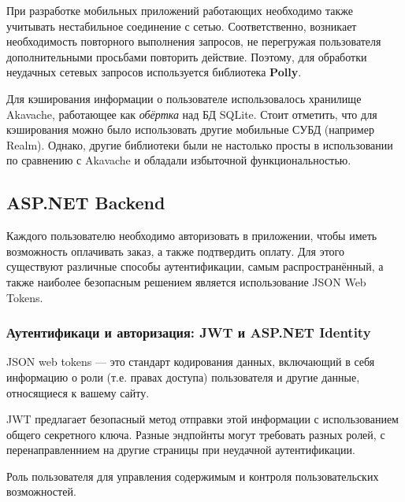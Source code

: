 \documentclass[14pt]{matmex-diploma-custom}
\begin{document}
	    При разработке мобильных приложений работающих необходимо также учитывать нестабильное соединение с сетью.
	    Соответственно, возникает необходимость повторного выполнения запросов, не перегружая пользователя дополнительными просьбами повторить действие.
	    Поэтому, для обработки неудачных сетевых запросов используется библиотека \textbf{Polly}\cite{polly_github}.

	    Для кэширования информации о пользователе использовалось хранилище Akavache\cite{akavache_github}, работающее как {\it обёртка} над БД SQLite.
	    Стоит отметить, что для кэширования можно было использовать другие мобильные СУБД (например Realm).
	    Однако, другие библиотеки были не настолько просты в использовании по сравнению с Akavache и обладали избыточной функциональностью.

	\subsection{ASP.NET Backend}
	    Каждого пользователю необходимо авторизовать в приложении, чтобы иметь возможность оплачивать заказ, а также подтвердить оплату.
	    Для этого существуют различные способы аутентификации, самым распространённый, а также наиболее безопасным решением является использование JSON Web Tokens.

	    \subsubsection{Аутентификаци и авторизация: JWT и ASP.NET Identity}
	        JSON web tokens — это стандарт кодирования данных, включающий в себя информацию о роли (т.е. правах доступа) пользователя и другие данные, относящиеся к вашему сайту.

	        JWT предлагает безопасный метод отправки этой информации с использованием общего секретного ключа.
	        Разные эндпойнты могут требовать разных ролей, с перенаправленнием на другие страницы при неудачной аутентификации.

	        Роль пользователя для управления содержимым и контроля пользовательских возможностей.
\end{document}
